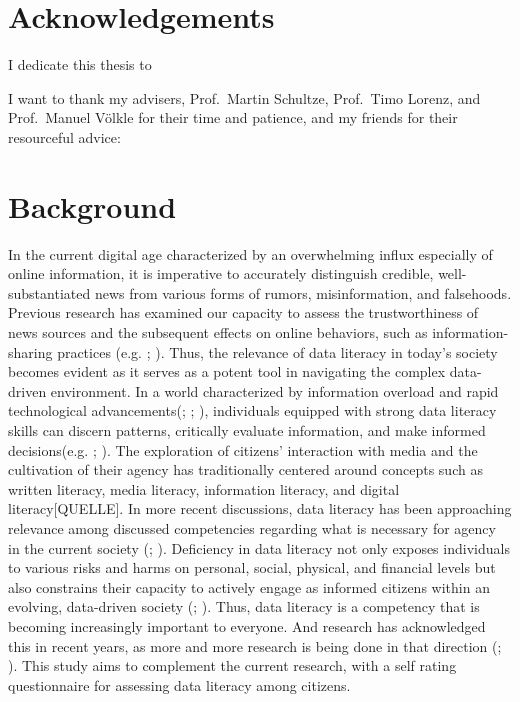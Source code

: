 \documentclass[
  12pt,
  a4paper,
  twoside]{article}
\begin{document}
\section*{Acknowledgements}\label{acknowledgements}

I dedicate this thesis to

I want to thank my advisers, Prof.~Martin Schultze, Prof.~Timo Lorenz, and Prof.~Manuel Völkle for their time and patience, and my friends for their resourceful advice:

\newpage\null\thispagestyle{empty}\newpage

\section{Background}\label{background}

In the current digital age characterized by an overwhelming influx especially of online information, it is imperative to accurately distinguish credible, well-substantiated news from various forms of rumors, misinformation, and falsehoods. Previous research has examined our capacity to assess the trustworthiness of news sources and the subsequent effects on online behaviors, such as information-sharing practices (e.g. ; ).
Thus, the relevance of data literacy in today's society becomes evident as it serves as a potent tool in navigating the complex data-driven environment. In a world characterized by information overload and rapid technological advancements(; ; ), individuals equipped with strong data literacy skills can discern patterns, critically evaluate information, and make informed decisions(e.g. ; ).
The exploration of citizens' interaction with media and the cultivation of their agency has traditionally centered around concepts such as written literacy, media literacy, information literacy, and digital literacy{[}QUELLE{]}. In more recent discussions, data literacy has been approaching relevance among discussed competencies regarding what is necessary for agency in the current society (; ). Deficiency in data literacy not only exposes individuals to various risks and harms on personal, social, physical, and financial levels but also constrains their capacity to actively engage as informed citizens within an evolving, data-driven society (; ). Thus, data literacy is a competency that is becoming increasingly important to everyone. And research has acknowledged this in recent years, as more and more research is being done in that direction (; ). This study aims to complement the current research, with a self rating questionnaire for assessing data literacy among citizens.
\end{document}
